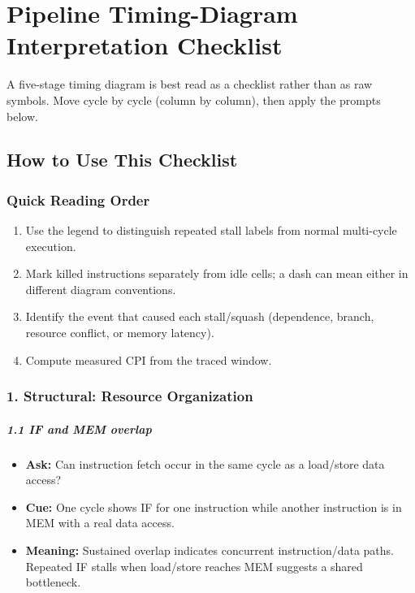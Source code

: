 \chapter{Pipeline Timing-Diagram Interpretation Checklist}\label{ch:timing-diagram-checklist}
A five-stage timing diagram is best read as a checklist rather than as raw symbols.
Move cycle by cycle (column by column), then apply the prompts below.


\section{How to Use This Checklist}\label{sec:timing-checklist-usage}

\subsection*{Quick Reading Order}\label{subsec:auto-014}
\begin{enumerate}
    \item Use the legend to distinguish repeated stall labels from normal multi-cycle execution.
    \item Mark killed instructions separately from idle cells; a dash can mean either in different diagram conventions.
    \item Identify the event that caused each stall/squash (dependence, branch, resource conflict, or memory latency).
    \item Compute measured CPI from the traced window.
\end{enumerate}

\subsection*{1. Structural: Resource Organization}\label{subsec:auto-015}

\paragraph{1.1 IF and MEM overlap}\label{par:auto-028}
\begin{itemize}
    \item \textbf{Ask:} Can instruction fetch occur in the same cycle as a load/store data access?
    \item \textbf{Cue:} One cycle shows IF for one instruction while another instruction is in MEM with a real data access.
    \item \textbf{Meaning:} Sustained overlap indicates concurrent instruction/data paths.
    Repeated IF stalls when load/store reaches MEM suggests a shared bottleneck.
\end{itemize}

